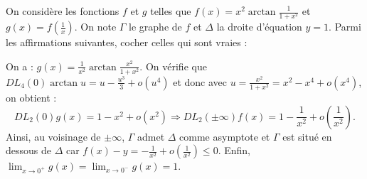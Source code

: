 \begin{question}
On considère les fonctions $f$ et $g$ telles que $\displaystyle f(x)=x^2\arctan \frac{1}{1+x^2}$ et $\displaystyle g(x)=f\left(\frac{1}{x}\right)$. On note $\Gamma$ le graphe de $f$ et $\Delta$ la droite d'équation $\displaystyle y=1$. Parmi les affirmations suivantes, cocher celles qui sont vraies :
\begin{answers}  
\end{answers}
\vskip2mm
\begin{explanations}
On a : $\displaystyle g(x)=\frac{1}{x^2}\arctan \frac{x^2}{1+x^2}$. On vérifie que $\displaystyle DL_4(0)\arctan u=u-\frac{u^3}{3}+o(u^4)$ et donc avec $\displaystyle u=\frac{x^2}{1+x^2}=x^2-x^4+o(x^4)$, on obtient :
$$DL_2(0)g(x)=1-x^2+o(x^2) \Rightarrow DL_2(\pm\infty)f(x)=1-\frac{1}{x^2}+o\left(\frac{1}{x^2}\right).$$
Ainsi, au voisinage de $\pm\infty$, $\Gamma$ admet $\Delta$ comme asymptote et $\Gamma$ est situé en dessous de $\Delta$ car $\displaystyle f(x)-y=-\frac{1}{x^2}+o\left(\frac{1}{x^2}\right)\leq 0$. Enfin, $\displaystyle \lim _{x\to 0^+}g(x)=\lim _{x\to 0^-}g(x)=1$.
\end{explanations}
\end{question}

